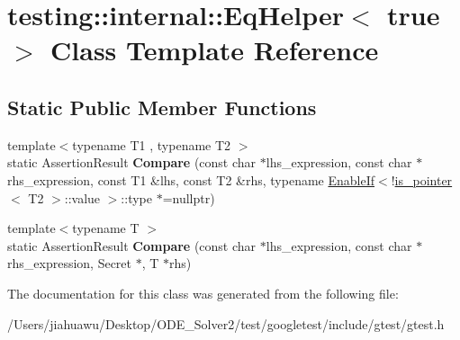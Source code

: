 \hypertarget{classtesting_1_1internal_1_1_eq_helper_3_01true_01_4}{}\section{testing\+:\+:internal\+:\+:Eq\+Helper$<$ true $>$ Class Template Reference}
\label{classtesting_1_1internal_1_1_eq_helper_3_01true_01_4}
\subsection*{Static Public Member Functions}
\begin{DoxyCompactItemize}
\item 
\mbox{\label{classtesting_1_1internal_1_1_eq_helper_3_01true_01_4_acfb9f52ad97d6139150685d752396f31}} 
{\footnotesize template$<$typename T1 , typename T2 $>$ }\\static Assertion\+Result {\bfseries Compare} (const char $\ast$lhs\+\_\+expression, const char $\ast$rhs\+\_\+expression, const T1 \&lhs, const T2 \&rhs, typename \mbox{\hyperlink{structtesting_1_1internal_1_1_enable_if}{Enable\+If}}$<$!\mbox{\hyperlink{structtesting_1_1internal_1_1is__pointer}{is\+\_\+pointer}}$<$ T2 $>$\+::value $>$\+::type $\ast$=nullptr)
\item 
\mbox{\label{classtesting_1_1internal_1_1_eq_helper_3_01true_01_4_a6f292601a68c8f0d49e6d48bd309b900}} 
{\footnotesize template$<$typename T $>$ }\\static Assertion\+Result {\bfseries Compare} (const char $\ast$lhs\+\_\+expression, const char $\ast$rhs\+\_\+expression, Secret $\ast$, T $\ast$rhs)
\end{DoxyCompactItemize}


The documentation for this class was generated from the following file\+:\begin{DoxyCompactItemize}
\item 
/\+Users/jiahuawu/\+Desktop/\+O\+D\+E\+\_\+\+Solver2/test/googletest/include/gtest/gtest.\+h\end{DoxyCompactItemize}
